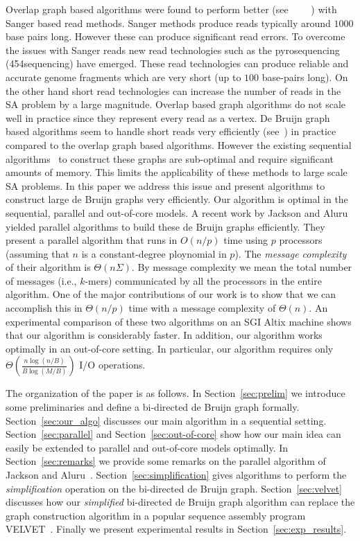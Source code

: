 \documentclass[11pt,conference,twocolumn]{IEEEtran}
\begin{document}
Overlap graph based algorithms were found to perform better 
(see ~\cite{PCAP}~\cite{CELERA}~\cite{ARCHANE}~\cite{PHRAP}) with Sanger based read methods. Sanger
methods produce reads typically around $1000$ base pairs long. However these can produce significant
read errors. To overcome the issues with Sanger reads new read technologies such as the 
pyrosequencing (454sequencing) have emerged. These read technologies can produce reliable and 
accurate genome fragments which are very short (up to $100$ base-pairs long). On the other hand short read
technologies can increase the number of reads in the SA problem by a large magnitude. Overlap based
graph algorithms do not scale well in practice since they represent every read as a vertex. De Bruijn
graph based algorithms seem to handle short reads very efficiently (see~\cite{velvet08}) in practice
compared to the overlap graph based algorithms. However the existing sequential algorithms~\cite{velvet08} 
to construct these graphs are sub-optimal and require significant amounts of memory. This limits the
applicability of these methods to large scale SA problems. In this paper we address this issue and present
algorithms to construct large de Bruijn graphs very efficiently. Our algorithm is optimal in the sequential,
parallel and out-of-core models.  A recent work by Jackson and Aluru~\cite{par_bidirected_graph} yielded
parallel algorithms to build these de Bruijn graphs efficiently. They present a parallel algorithm 
that runs in $O(n/p)$ time using $p$ processors (assuming that $n$ is a constant-degree ploynomial in $p$).
The {\em message complexity} of their algorithm is $\Theta(n\Sigma)$. By message complexity we mean
the total number of messages (i.e., $k$-mers) communicated by all the processors in the entire algorithm.
One of the major contributions of our
work is to show that we can accomplish this in $\Theta(n/p)$ time with a message complexity of $\Theta(n)$. An experimental
comparison of these two algorithms on an SGI Altix machine shows that our algorithm is considerably faster.
In addition, our algorithm works optimally in an out-of-core setting. In particular, our algorithm requires only
$\Theta(\frac{n\log(n/B)}{B\log(M/B)})$ I/O operations.

The organization of the paper is as follows. In Section~\ref{sec:prelim} we introduce some preliminaries
and define a bi-directed de Bruijn graph formally. Section~\ref{sec:our_algo} discusses our main algorithm
in a sequential setting. Section~\ref{sec:parallel} and Section~\ref{sec:out-of-core} show how our main 
idea can easily be extended to parallel and out-of-core models optimally. In Section~\ref{sec:remarks} 
we provide some remarks on the parallel algorithm of Jackson and Aluru~\cite{par_bidirected_graph}.
Section~\ref{sec:simplification} gives algorithms to perform the {\em simplification}
operation on the bi-directed de Bruijn graph. Section~\ref{sec:velvet} discusses how our {\em simplified}
bi-directed de Bruijn graph algorithm can replace the graph construction algorithm in a popular sequence
assembly program VELVET~\cite{velvet08}. Finally we present experimental results in Section~\ref{sec:exp_results}.
\end{document}
